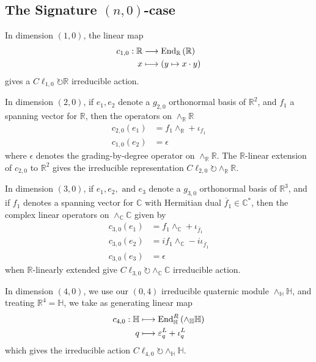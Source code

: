 \documentclass[openany, 11pt]{article}
\theoremstyle{definition}
\theoremstyle{remark}
\def\lp{\ensuremath{\left(}}
\def\rp{\ensuremath{\right)}}
\def\bC{\ensuremath{\mathbb{C}}}
\def\bH{\ensuremath{\mathbb{H}}}
\def\bR{\ensuremath{\mathbb{R}}}
\def\End{\ensuremath{\textnormal{End}}}
\begin{document}
\subsection{The Signature $(n,0)$-case}
In dimension $(1,0)$, the linear map
\begin{align*}
    c_{1,0}:\bR&\longrightarrow \End_{\bR}\lp \bR\rp\\
    x&\longmapsto \lp y\mapsto x\cdot y\rp
\end{align*}
gives a $C\ell_{1,0}\circlearrowright \bR$ irreducible action.\par
In dimension $(2,0)$, if $e_1,e_2$ denote a $g_{2,0}$ orthonormal basis of $\bR^2$, and $f_1$ a spanning vector for $\bR$, then the operators on $\wedge_{\bR}\bR$
\begin{align*}
    c_{2,0}(e_1)&=f_1\wedge_{\bR}+\iota_{f_1}\\
    c_{1,0}(e_2)&=\epsilon
\end{align*}
where $\epsilon$ denotes the grading-by-degree operator on $\wedge_{\bR}\bR$. The $\bR$-linear extension of $c_{2,0}$ to $\bR^2$ gives the irreducible representation $C\ell_{2,0}\circlearrowright \wedge_{\bR}\bR$.\par
In dimension $(3,0)$, if $e_1,e_2,\text{ and }e_3$ denote a $g_{3,0}$ orthonormal basis of $\bR^3$, and if $f_1$ denotes a spanning vector for $\bC$ with Hermitian dual $\overline{f}_1\in\bC^*$, then the complex linear operators on $\wedge_{\bC}\bC$ given by
\begin{align*}
    c_{3,0}(e_1)&=f_1\wedge_{\bC}+\iota_{\overline{f}_1}\\
    c_{3,0}(e_2)&=if_1\wedge_{\bC}-i\iota_{\overline{f}_1}\\
    c_{3,0}(e_3)&=\epsilon
\end{align*}
when $\bR$-linearly extended give $C\ell_{3,0}\circlearrowright\wedge_{\bC}\bC$ irreducible action.\par
In dimension $(4,0)$, we use our $(0,4)$ irreducible quaternic module $\wedge_{\bH}\bH$, and treating $\bR^4=\bH$, we take as generating linear map
\begin{align*}
    c_{4,0}:\bH&\longmapsto\End^R_{\bH}\lp\wedge_{\bH}\bH\rp\\
    q&\longmapsto \varepsilon^L_q+\iota^L_q
\end{align*}
which gives the irreducible action $C\ell_{4,0}\circlearrowright\wedge_{\bH}\bH$.
\end{document}
